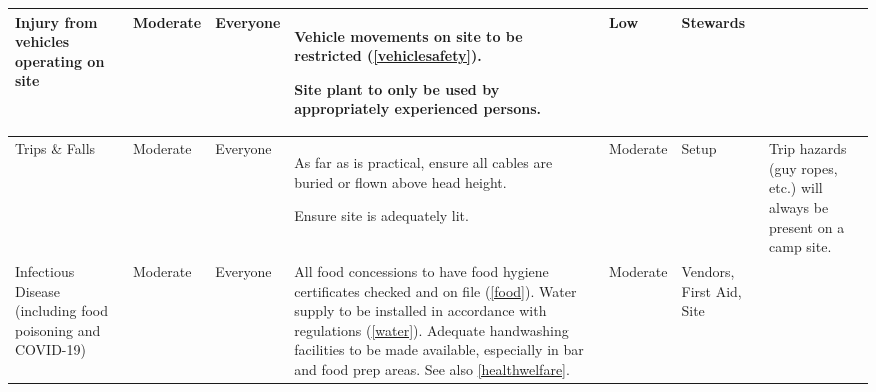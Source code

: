 \begin{landscape}
\begin{table}[h!]
\begin{tabular}{| p{3cm} | l | p{1.5cm} | p{9cm} | p{1.5cm} | p{2cm} | p{5cm} |}
            Injury from vehicles operating on site                                                                 & Moderate                  & Everyone                                                              &
            Vehicle movements on site to be restricted (\cref{vehiclesafety}).

            Site plant to only be used by appropriately experienced persons.                                       &
            Low                                                                                                    & Stewards                  &                                                                                                                                                       \\ \hline

            Trips \& Falls                                                                                         & Moderate                  & Everyone                                                              &
            As far as is practical, ensure all cables are buried or flown above head height.

            Ensure site is adequately lit.                                                                         &
            Moderate                                                                                               & Setup                     & Trip hazards (guy ropes, etc.) will always be present on a camp site.                                                                                 \\ \hline

            Infectious Disease (including food poisoning and COVID-19)                                             & Moderate                  & Everyone                                                              &
            All food concessions to have food hygiene certificates checked and on file (\cref{food}).
            Water supply to be installed in accordance with regulations (\cref{water}).
            Adequate handwashing facilities to be made available, especially in bar and food prep areas.
            See also \cref{healthwelfare}.
                                                                                                                   & Moderate                  & Vendors, First Aid, Site                                              &                                                                               \\ \hline


\end{tabular}
\end{table}
\end{landscape}
